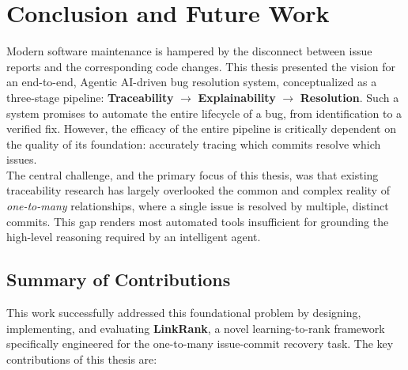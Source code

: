 \section{Conclusion and Future Work}

Modern software maintenance is hampered by the disconnect between issue reports and the corresponding code changes. This thesis presented the vision for an end-to-end, Agentic AI-driven bug resolution system, conceptualized as a three-stage pipeline: \textbf{Traceability} $\rightarrow$ \textbf{Explainability} $\rightarrow$ \textbf{Resolution}. Such a system promises to automate the entire lifecycle of a bug, from identification to a verified fix. However, the efficacy of the entire pipeline is critically dependent on the quality of its foundation: accurately tracing which commits resolve which issues.\\

\noindent
The central challenge, and the primary focus of this thesis, was that existing traceability research has largely overlooked the common and complex reality of \textit{one-to-many} relationships, where a single issue is resolved by multiple, distinct commits. This gap renders most automated tools insufficient for grounding the high-level reasoning required by an intelligent agent.

\subsection*{Summary of Contributions}

This work successfully addressed this foundational problem by designing, implementing, and evaluating \textbf{LinkRank}, a novel learning-to-rank framework specifically engineered for the one-to-many issue-commit recovery task. The key contributions of this thesis are:

